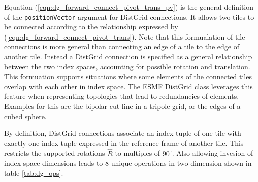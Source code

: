   Equation (\ref{eqn:dg_forward_connect_pivot_trans_pv}) is the general
   definition of the {\tt positionVector} argument for DistGrid connections.
   It allows two tiles to be connected according to the relationship expressed
   by (\ref{eqn:dg_forward_connect_pivot_trans}). Note that this formualation of
   tile connections is more general than connecting an edge of a tile to the
   edge of another tile. Instead a DistGrid connection is specified as a general 
   relationship between the two index spaces, accounting for possible rotation 
   and translation. This formuation supports situations where some elements of
   the connected tiles overlap with each other in index space. The ESMF 
   DistGrid class leverages this feature when representing topologies that
   lead to redundancies of elements. Examples for this are the bipolar cut line
   in a tripole grid, or the edges of a cubed sphere.
  
   By definition, DistGrid connections associate an index tuple of one tile
   with exactly one index tuple expressed in the reference frame of another tile.
   This restricts the supported rotations $\hat R$ to multiples of $90^{\circ}$.
   Also allowing invesion of index space dimensions leads to 8 unique 
   operations in two dimension shown in table \ref{tab:dg_ops}.
  
